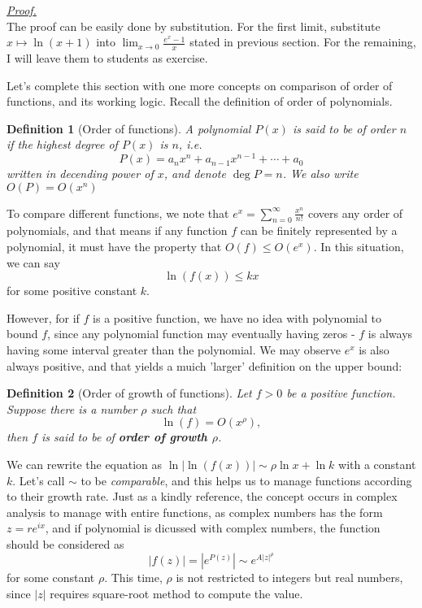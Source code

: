 \documentclass[12pt]{article}
\newtheorem{definition}{Definition}[section]
\renewenvironment{proof}[1][Proof]{\begin{snugshade*} \underline{\textit{{#1}.}}\\}{\hfill \qedsymbol \end{snugshade*}}
\begin{document}
    \begin{proof}
        The proof can be easily done by substitution. For the first limit, substitute $x\mapsto \ln(x+1)$ into $\displaystyle\lim_{x\to 0}\frac{e^x-1}{x}$ stated in previous section. For the remaining, I will leave them to students as exercise.
    \end{proof}

    Let's complete this section with one more concepts on comparison of order of functions, and its working logic. Recall the definition of order of polynomials.

    \begin{definition}[Order of functions]
        A polynomial $P(x)$ is said to be of order $n$ if the highest degree of $P(x)$ is $n$, i.e. \[P(x)=a_n x^n + a_{n-1} x^{n-1} + \cdots + a_0\] written in decending power of $x$, and denote $\deg{P}=n$. We also write $O(P)=O(x^n)$
    \end{definition}

    To compare different functions, we note that $e^x=\sum_{n=0}^{\infty}\frac{x^n}{n!}$ covers any order of polynomials, and that means if any function $f$ can be finitely represented by a polynomial, it must have the property that $O(f)\leq O(e^x)$. In this situation, we can say \[\ln(f(x))\leq kx\] for some positive constant $k$.

    However, for if $f$ is a positive function, we have no idea with polynomial to bound $f$, since any polynomial function may eventually having zeros - $f$ is always having some interval greater than the polynomial. We may observe $e^x$ is also always positive, and that yields a muich 'larger' definition on the upper bound:

    \begin{definition}[Order of growth of functions]
        Let $f>0$ be a positive function. Suppose there is a number $\rho$ such that \[\ln(f)=O(x^\rho),\] then $f$ is said to be of \textbf{order of growth $\rho$}.
    \end{definition}

    We can rewrite the equation as $\ln|\ln(f(x))|\sim\rho\ln{x}+\ln{k}$ with a constant $k$. Let's call $\sim$ to be \textit{comparable}, and this helps us to manage functions according to their growth rate. Just as a kindly reference, the concept occurs in complex analysis to manage with entire functions, as complex numbers has the form $z=re^{ix}$, and if polynomial is dicussed with complex numbers, the function should be considered as \[|f(z)|=|e^{P(z)}|\sim e^{A|z|^\rho}\] for some constant $\rho$. This time, $\rho$ is not restricted to integers but real numbers, since $|z|$ requires square-root method to compute the value.
\end{document}
